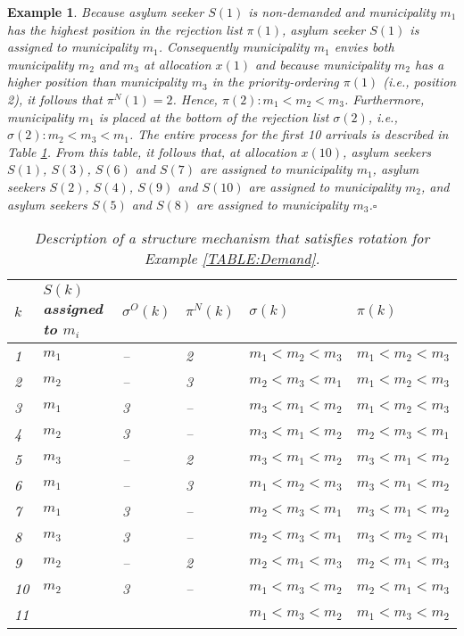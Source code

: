 \documentclass[12pt,fleqn]{article}
\newtheorem{example}{Example}
\begin{document}
\begin{example}
\noindent Because asylum seeker $S(1)$ is non-demanded and municipality $m_1$ has the highest position in the rejection list $\pi(1)$, asylum seeker $S(1)$ is assigned to municipality $m_1$. Consequently municipality $m_1$ envies both municipality $m_2$ and $m_3$ at allocation $x(1)$ and because municipality $m_2$ has a higher position than municipality $m_3$ in the priority-ordering $\pi(1)$ (i.e., position 2), it follows that $\pi^N(1)=2$. Hence, $\pi(2):m_1<m_2<m_3$. Furthermore, municipality $m_1$ is placed at the bottom of the rejection list $\sigma(2)$, i.e., $\sigma(2):m_2<m_3<m_1$. The entire process for the first 10 arrivals is described in Table \ref{TABLE:Mechanism}. From this table, it follows that, at allocation $x(10)$, asylum seekers $S(1)$, $S(3)$, $S(6)$ and $S(7)$ are assigned to municipality $m_1$, asylum seekers $S(2)$, $S(4)$, $S(9)$ and $S(10)$ are assigned to municipality $m_2$, and asylum seekers $S(5)$ and $S(8)$ are assigned to municipality $m_3$.\hfill $\square$

\begin{table}[h!]
\caption{Description of a structure mechanism that satisfies rotation for Example \ref{TABLE:Demand}.}\label{TABLE:Mechanism}
\begin{tabular}{llllll}\hline
$k$ & $S(k)$ assigned to $m_i$ & $\sigma^O(k)$ & $\pi^N(k)$ & $\sigma(k)$ & $\pi(k)$ \\ \hline
1   & $m_1$ & -- & 2 & $m_1<m_2<m_3$ & $m_1<m_2<m_3$ \\
2   & $m_2$ & -- & 3 & $m_2<m_3<m_1$ & $m_1<m_2<m_3$ \\
3   & $m_1$ & 3 & -- & $m_3<m_1<m_2$ & $m_1<m_2<m_3$ \\
4   & $m_2$ & 3 & -- & $m_3<m_1<m_2$ & $m_2<m_3<m_1$ \\
5   & $m_3$ & -- & 2 & $m_3<m_1<m_2$ & $m_3<m_1<m_2$ \\
6   & $m_1$ & -- & 3 & $m_1<m_2<m_3$ & $m_3<m_1<m_2$ \\
7   & $m_1$ & 3 & -- & $m_2<m_3<m_1$ & $m_3<m_1<m_2$ \\
8   & $m_3$ & 3 & -- & $m_2<m_3<m_1$ & $m_3<m_2<m_1$ \\
9   & $m_2$ & -- & 2 & $m_2<m_1<m_3$ & $m_2<m_1<m_3$ \\
10  & $m_2$ & 3 & -- & $m_1<m_3<m_2$ & $m_2<m_1<m_3$ \\ 
11  &       &   &    & $m_1<m_3<m_2$ & $m_1<m_3<m_2$ \\ \hline
\end{tabular}
\end{table}
\end{example}
\end{document}

